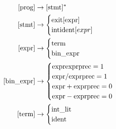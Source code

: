$$
\begin{align}
  [\text{prog}] &\to [\text{stmt}]^* \\
  [\text{stmt}] &\to
    \begin{cases}
      \text{exit} \space [\text{expr}] \\
      \text{int} \space \text{ident} [expr] \\
    \end{cases} \\
  [\text{expr}] &\to
    \begin{cases}
      \text{term} \\
      \text{bin\_expr} \\
    \end{cases} \\
  [\text{bin\_expr}] &\to
    \begin{cases}
      \text{expr} \space \text{expr} \text{prec} = 1\\
      \text{expr} / \text{expr} \text{prec} = 1\\
      \text{expr} + \text{expr} \text{prec} = 0\\
      \text{expr} - \text{expr} \text{prec} = 0\\
    \end{cases} \\
  [\text{term}] &\to
    \begin{cases}
      \text{int\_lit} \\
      \text{ident} \\
    \end{cases}
\end{align}
$$

